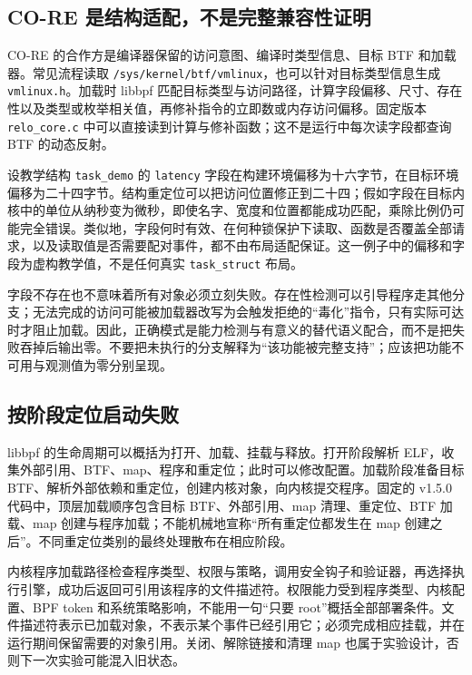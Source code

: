 \documentclass[UTF8,fontset=fandol,openany,11pt]{ctexbook}
\begin{document}
\subsection{CO-RE 是结构适配，不是完整兼容性证明}

CO-RE 的合作方是编译器保留的访问意图、编译时类型信息、目标 BTF 和加载器。常见流程读取 \texttt{/\allowbreak{}sys/\allowbreak{}kernel/\allowbreak{}btf/\allowbreak{}vmlinux}，也可以针对目标类型信息生成 \texttt{vmlinux.\allowbreak{}h}。加载时 libbpf 匹配目标类型与访问路径，计算字段偏移、尺寸、存在性以及类型或枚举相关值，再修补指令的立即数或内存访问偏移。固定版本 \texttt{relo\_\allowbreak{}core.\allowbreak{}c} 中可以直接读到计算与修补函数；这不是运行中每次读字段都查询 BTF 的动态反射。\cite{eb-libbpf-overview}\cite{eb-core-relo}


设教学结构 \texttt{task\_\allowbreak{}demo} 的 \texttt{latency} 字段在构建环境偏移为十六字节，在目标环境偏移为二十四字节。结构重定位可以把访问位置修正到二十四；假如字段在目标内核中的单位从纳秒变为微秒，即使名字、宽度和位置都能成功匹配，乘除比例仍可能完全错误。类似地，字段何时有效、在何种锁保护下读取、函数是否覆盖全部请求，以及读取值是否需要配对事件，都不由布局适配保证。这一例子中的偏移和字段为虚构教学值，不是任何真实 \texttt{task\_\allowbreak{}struct} 布局。\cite{eb-core-relo}\cite{eb-btf}


字段不存在也不意味着所有对象必须立刻失败。存在性检测可以引导程序走其他分支；无法完成的访问可能被加载器改写为会触发拒绝的“毒化”指令，只有实际可达时才阻止加载。因此，正确模式是能力检测与有意义的替代语义配合，而不是把失败吞掉后输出零。不要把未执行的分支解释为“该功能被完整支持”；应该把功能不可用与观测值为零分别呈现。\cite{eb-core-relo}\cite{eb-verifier-code}


\subsection{按阶段定位启动失败}

libbpf 的生命周期可以概括为打开、加载、挂载与释放。打开阶段解析 ELF，收集外部引用、BTF、map、程序和重定位；此时可以修改配置。加载阶段准备目标 BTF、解析外部依赖和重定位，创建内核对象，向内核提交程序。固定的 v1.5.0 代码中，顶层加载顺序包含目标 BTF、外部引用、map 清理、重定位、BTF 加载、map 创建与程序加载；不能机械地宣称“所有重定位都发生在 map 创建之后”。不同重定位类别的最终处理散布在相应阶段。\cite{eb-libbpf-load}


内核程序加载路径检查程序类型、权限与策略，调用安全钩子和验证器，再选择执行引擎，成功后返回可引用该程序的文件描述符。权限能力受到程序类型、内核配置、BPF token 和系统策略影响，不能用一句“只要 root”概括全部部署条件。文件描述符表示已加载对象，不表示某个事件已经引用它；必须完成相应挂载，并在运行期间保留需要的对象引用。关闭、解除链接和清理 map 也属于实验设计，否则下一次实验可能混入旧状态。\cite{eb-load-syscall}\cite{eb-libbpf-overview}
\end{document}
